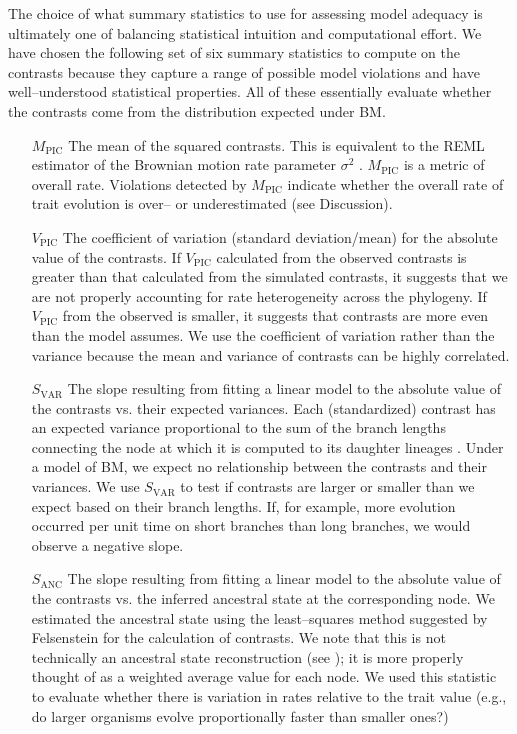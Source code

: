 \documentclass[a4paper,12pt]{article}
\begin{document}
The choice of what summary statistics to use for assessing model adequacy is ultimately one of balancing statistical intuition and computational effort. We have chosen the following set of six summary statistics to compute on the contrasts because they capture a range of possible model violations and have well--understood statistical properties. All of these essentially evaluate whether the contrasts come from the distribution expected under BM. 

\begin{enumerate}
\item[$M_{\text{PIC}}$] The mean of the squared contrasts. This is equivalent to the REML estimator of the Brownian motion rate parameter $\sigma^2$ \citep{Garland1992, Rohlf2001}. $M_{\text{PIC}}$ is a metric of overall rate. Violations detected by $M_{\text{PIC}}$ indicate whether the overall rate of trait evolution is over-- or underestimated (see Discussion).

\item[$V_{\text{PIC}}$] The coefficient of variation (standard deviation/mean) for the absolute value of the contrasts. If $V_{\text{PIC}}$ calculated from the observed contrasts is greater than that calculated from the simulated contrasts, it suggests that we are not properly accounting for rate heterogeneity across the phylogeny. If $V_{\text{PIC}}$ from the observed is smaller, it suggests that contrasts are more even than the model assumes. We use the coefficient of variation rather than the variance because the mean and variance of contrasts can be highly correlated.

\item[$S_{\text{VAR}}$] The slope resulting from fitting a linear model to the absolute value of the contrasts vs. their expected variances. Each (standardized) contrast has an expected variance proportional to the sum of the branch lengths connecting the node at which it is computed to its daughter lineages  \citep{Felsenstein1985}. Under a model of BM, we expect no relationship between the contrasts and their variances. We use $S_{\text{VAR}}$ to test if contrasts are larger or smaller than we expect based on their branch lengths. If, for example, more evolution occurred per unit time on short branches than long branches, we would observe a negative slope.

\item[$S_{\text{ANC}}$] The slope resulting from fitting a linear model to the absolute value of the contrasts vs. the inferred ancestral state at the corresponding node. We estimated the ancestral state using the least--squares method suggested by Felsenstein \citep{Felsenstein1985} for the calculation of contrasts. We note that this is not technically an ancestral state reconstruction (see \citep{Felsenstein1985}); it is more properly thought of as a weighted average value for each node. We used this statistic to evaluate whether there is variation in rates relative to the trait value (e.g., do larger organisms evolve proportionally faster than smaller ones?)


\end{enumerate}
\end{document}
